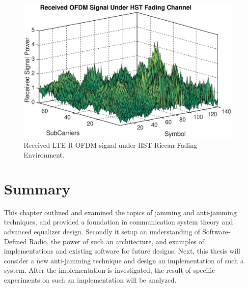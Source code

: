 \begin{figure}[!ht]
\label{lteofdma}
\centering
\includegraphics[width=\linewidth,keepaspectratio]{images/Gill/lte_figs/receivedsignal.eps} 
\caption{Received LTE-R OFDM signal under HST Ricean Fading Environment. }
\end{figure}

\section{Summary}
This chapter outlined and examined the topics of jamming and anti-jamming techniques, and provided a foundation in communication system theory and advanced equalizer design.  Secondly it setup an understanding of Software-Defined Radio, the power of such an architecture, and examples of implementations and existing software for future designs.  Next, this thesis will consider a new anti-jamming technique and design an implementation of such a system.  After the implementation is investigated, the result of specific experiments on such an implementation will be analyzed.\\

